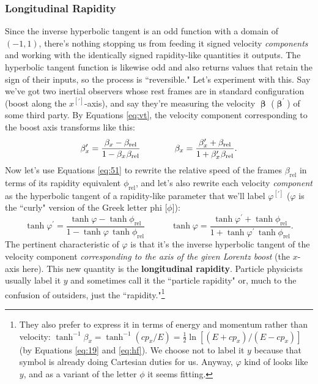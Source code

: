 \documentclass[12pt]{article}
\newcommand{\vvbeta}{\bm{\upbeta}}
\begin{document}
\subsubsection{Longitudinal Rapidity}

Since the inverse hyperbolic tangent is an odd function with a domain of $(-1, 1)$, there's nothing stopping us from feeding it signed velocity \emph{components} and working with the identically signed rapidity-like quantities it outputs. The hyperbolic tangent function is likewise odd and also returns values that retain the sign of their inputs, so the process is ``reversible." Let's experiment with this. Say we've got two inertial observers whose rest frames are in standard configuration (boost along the $x^{[\prime]}$-axis), and say they're measuring the velocity $\vvbeta$ ($\vvbeta^\prime$) of some third party. By Equations \ref{eq:vt}, the velocity component corresponding to the boost axis transforms like this:
\begin{equation*}
\beta_x^{\prime} = \frac{\beta_x - \beta_{\textrm{rel}}}{1 - \beta_{x} \mkern1mu \beta_{\textrm{rel}}} \qquad \qquad \beta_x = \frac{\beta_x^{\prime} + \beta_{\textrm{rel}}}{1 + \beta_x^{\prime} \mkern1mu \beta_{\textrm{rel}}}.
\end{equation*}
Now let's use Equations \ref{eq:51} to rewrite the relative speed of the frames $\beta_{\textrm{rel}}$ in terms of its rapidity equivalent $\phi_{\textrm{rel}}$, and let's also rewrite each velocity \emph{component} as the hyperbolic tangent of a rapidity-like parameter that we'll label $\varphi^{[\prime]}$ ($\varphi$ is the ``curly" version of the Greek letter phi [$\phi$]):
\begin{equation}\label{eq:th}
\tanh{\varphi^{\prime}} = \frac{\tanh{\varphi} - \tanh{\phi_{\textrm{rel}}}}{1 - \tanh{\varphi} \,  \tanh{\phi_{\textrm{rel}}}} \qquad \quad \tanh{\varphi} = \frac{\tanh{\varphi^{\prime}} + \tanh{\phi_{\textrm{rel}}}}{1 + \tanh{\varphi^{\prime}} \, \tanh{\phi_{\textrm{rel}}}} .
\end{equation}
The pertinent characteristic of $\varphi$ is that it's the inverse hyperbolic tangent of the velocity component \emph{corresponding to the axis of the given Lorentz boost} (the $x$-axis here). This new quantity is the \textbf{longitudinal rapidity}. Particle physicists usually label it $y$ and sometimes call it the ``particle rapidity" or, much to the confusion of outsiders, just the ``rapidity."\footnote{They also prefer to express it in terms of energy and momentum rather than velocity: $\tanh^{-1}{\beta_x} = \tanh^{-1}{(cp_x / E)} = \frac{1}{2} \ln{[(E + cp_x) / (E - cp_x) ]}$ (by Equations \ref{eq:19} and \ref{eq:hf}). We choose not to label it $y$ because that symbol is already doing Cartesian duties for us. Anyway, $\varphi$ kind of looks like $y$, and as a variant of the letter $\phi$ it seems fitting.}
\end{document}
